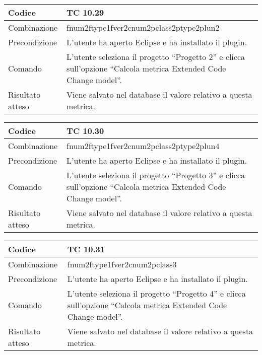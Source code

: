 \begin{table}[ht]
\begin{tabular}{|p{3cm}|p{9cm}|}
\hline
\cellcolor{lightgray}Codice				& TC 10.29								\\
\hline
\cellcolor{lightgray}Combinazione		& fnum2ftype1fver2cnum2pclass2ptype2plun2									\\
\hline
\cellcolor{lightgray}Precondizione		& L'utente ha aperto Eclipse e ha installato il plugin.		\\
\hline
\cellcolor{lightgray}Comando			& L'utente seleziona il progetto ``Progetto 2''  e clicca sull'opzione ``Calcola metrica Extended Code Change model''.	\\
\hline
\cellcolor{lightgray}Risultato atteso	& Viene salvato nel database il valore relativo a questa metrica.\\
\hline
\end{tabular}
\end{table}

\begin{table}[ht]
\begin{tabular}{|p{3cm}|p{9cm}|}
\hline
\cellcolor{lightgray}Codice				& TC 10.30								\\
\hline
\cellcolor{lightgray}Combinazione		& fnum2ftype1fver2cnum2pclass2ptype2plun4									\\
\hline
\cellcolor{lightgray}Precondizione		& L'utente ha aperto Eclipse e ha installato il plugin.		\\
\hline
\cellcolor{lightgray}Comando			& L'utente seleziona il progetto ``Progetto 3''  e clicca sull'opzione ``Calcola metrica Extended Code Change model''.	\\
\hline
\cellcolor{lightgray}Risultato atteso	& Viene salvato nel database il valore relativo a questa metrica.\\
\hline
\end{tabular}
\end{table}

\begin{table}[ht]
\begin{tabular}{|p{3cm}|p{9cm}|}
\hline
\cellcolor{lightgray}Codice				& TC 10.31								\\
\hline
\cellcolor{lightgray}Combinazione		& fnum2ftype1fver2cnum2pclass3									\\
\hline
\cellcolor{lightgray}Precondizione		& L'utente ha aperto Eclipse e ha installato il plugin.		\\
\hline
\cellcolor{lightgray}Comando			& L'utente seleziona il progetto ``Progetto 4''  e clicca sull'opzione ``Calcola metrica Extended Code Change model''.	\\
\hline
\cellcolor{lightgray}Risultato atteso	& Viene salvato nel database il valore relativo a questa metrica.\\
\hline
\end{tabular}
\end{table}

